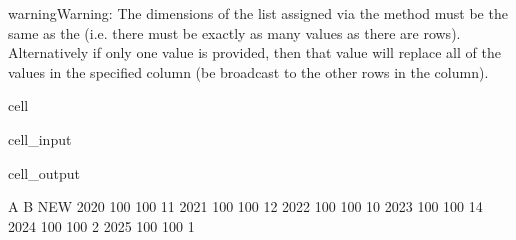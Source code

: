 \documentclass[letterpaper,10pt,english]{jupyterBook}
\begin{document}
\begin{sphinxadmonition}{warning}{Warning:}
\sphinxAtStartPar
The dimensions of the list assigned via the \sphinxcode{\sphinxupquote{=}} method must be the same as the  (i.e. there must be exactly as many values as there are rows).  Alternatively if only one value is provided, then that value will replace all of the values in the specified column (be broadcast to the other rows in the column).
\end{sphinxadmonition}

\begin{sphinxuseclass}{cell}\begin{sphinxVerbatimInput}

\begin{sphinxuseclass}{cell_input}
\begin{sphinxVerbatim}[commandchars=\\\{\}]
\PYG{p}{[}\PYG{p}{]}\PYG{p}{[}\PYG{p}{]}

\end{sphinxVerbatim}

\end{sphinxuseclass}\end{sphinxVerbatimInput}
\begin{sphinxVerbatimOutput}

\begin{sphinxuseclass}{cell_output}
\begin{sphinxVerbatim}[commandchars=\\\{\}]
        A    B  NEW
2020  100  100   11
2021  100  100   12
2022  100  100   10
2023  100  100   14
2024  100  100    2
2025  100  100    1
\end{sphinxVerbatim}

\end{sphinxuseclass}\end{sphinxVerbatimOutput}

\end{sphinxuseclass}
\end{document}
